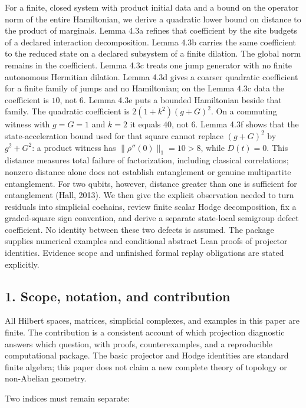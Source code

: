 \documentclass[
  11pt,
]{article}
\begin{document}
For a finite, closed system with product initial data and a bound on the operator norm of the entire Hamiltonian, we derive a quadratic lower bound on distance to the product of marginals. Lemma 4.3a refines that coefficient by the site budgets of a declared interaction decomposition. Lemma 4.3b carries the same coefficient to the reduced state on a declared subsystem of a finite dilation. The global norm remains in the coefficient. Lemma 4.3c treats one jump generator with no finite autonomous Hermitian dilation. Lemma 4.3d gives a coarser quadratic coefficient for a finite family of jumps and no Hamiltonian; on the Lemma 4.3c data the coefficient is \(10\), not \(6\). Lemma 4.3e puts a bounded Hamiltonian beside that family. The quadratic coefficient is \(2(1+k^2)(g+G)^2\). On a commuting witness with \(g=G=1\) and \(k=2\) it equals \(40\), not \(6\). Lemma 4.3f shows that the state-acceleration bound used for that square cannot replace \((g+G)^2\) by \(g^2+G^2\): a product witness has \(\|\rho''(0)\|_1=10>8\), while \(D(t)=0\). This distance measures total failure of factorization, including classical correlations; nonzero distance alone does not establish entanglement or genuine multipartite entanglement. For two qubits, however, distance greater than one is sufficient for entanglement (Hall, 2013). We then give the explicit observation needed to turn residuals into simplicial cochains, review finite scalar Hodge decomposition, fix a graded-square sign convention, and derive a separate state-local semigroup defect coefficient. No identity between these two defects is assumed. The package supplies numerical examples and conditional abstract Lean proofs of projector identities. Evidence scope and unfinished formal replay obligations are stated explicitly.

\subsection{1. Scope, notation, and contribution}\label{scope-notation-and-contribution}

All Hilbert spaces, matrices, simplicial complexes, and examples in this paper are finite. The contribution is a consistent account of which projection diagnostic answers which question, with proofs, counterexamples, and a reproducible computational package. The basic projector and Hodge identities are standard finite algebra; this paper does not claim a new complete theory of topology or non-Abelian geometry.

Two indices must remain separate:
\end{document}
